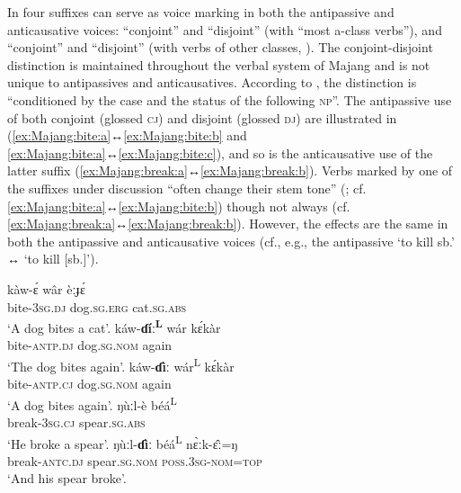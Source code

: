 In  four suffixes can serve as voice marking in both the antipassive and anticausative voices: “conjoint”  and “disjoint”  (with “most a-class verbs”), and “conjoint”  and “disjoint”  (with verbs of other  classes, \citealt[227]{joswig:2019}). The conjoint-disjoint distinction is maintained throughout the verbal system of Majang and is not unique to antipassives and anticausatives. According to \citet[132]{joswig:2019}, the distinction is “conditioned by the case and the  status of the following \textsc{np}”. The antipassive use of both conjoint  (glossed \textsc{cj}) and disjoint  (glossed \textsc{dj}) are illustrated in (\ref{ex:Majang:bite:a}↔\ref{ex:Majang:bite:b} and \ref{ex:Majang:bite:a}↔\ref{ex:Majang:bite:c}), and so is the anticausative use of the latter suffix (\ref{ex:Majang:break:a}↔\ref{ex:Majang:break:b}). Verbs marked by one of the suffixes under discussion “often change their stem tone” (\citealt[229]{joswig:2019}; cf. \ref{ex:Majang:bite:a}↔\ref{ex:Majang:bite:b}) though not always (cf. \ref{ex:Majang:break:a}↔\ref{ex:Majang:break:b}). However, the effects are the same in both the antipassive and anticausative voices (cf., e.g., the antipassive   ‘to kill sb.’ ↔  ‘to kill [sb.]’). 

\ea {} \citep[228, 361]{joswig:2019}
\ea\label{ex:Majang:bite:a}
	\gll	kàw-ɛ́ wâr èːɟɛ́ \\
			bite-\textsc{3sg.dj} dog.\textsc{sg.erg} cat.\textsc{sg.abs} \\
	\glt	‘A dog bites a cat’.
\ex\label{ex:Majang:bite:b}
	\gll	káw-\textbf{ɗíː\textsuperscript{L}} wár kɛ́kàr \\
			bite-\textsc{antp.dj} dog.\textsc{sg.nom} again \\
	\glt	‘The dog bites again’.
\ex\label{ex:Majang:bite:c}
	\gll	káw-\textbf{ɗìː} wár\textsuperscript{L} kɛ́kàr \\
			bite-\textsc{antp.cj} dog.\textsc{sg.nom} again \\
	\glt	‘A dog bites again’.
\ex\label{ex:Majang:break:a}
	\gll	ŋùːl-è béá\textsuperscript{L} \\
			break-\textsc{3sg.cj} spear.\textsc{sg.abs} \\
	\glt	‘He broke a spear’.
\ex\label{ex:Majang:break:b}
	\gll	ŋùːl-\textbf{ɗìː} béá\textsuperscript{L} nɛ̀ːk-ɛ̂ː=ŋ \\
			break-\textsc{antc.dj} spear.\textsc{sg.nom} \textsc{poss.3sg-nom=top} \\
	\glt	‘And his spear broke’.
	\z 
\z

